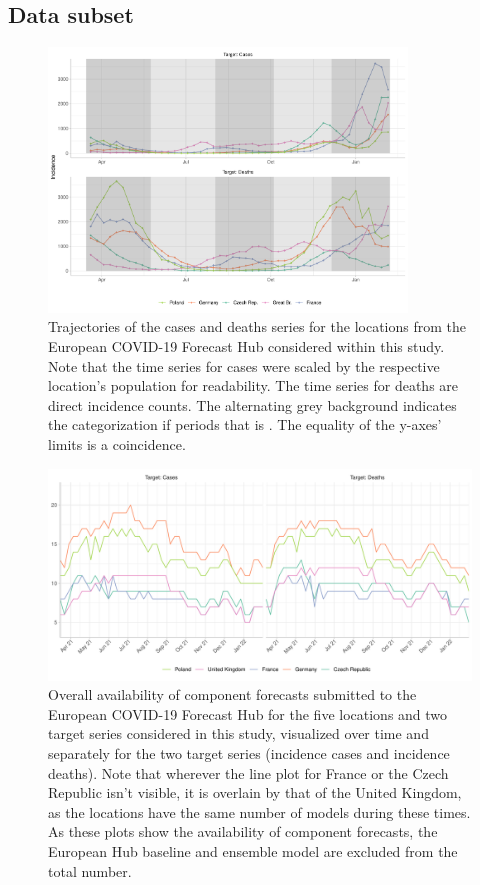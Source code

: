 \subsection{Data subset} \label{sub:hub_data}
\begin{figure}
\centering
\includegraphics[width = 0.85\textwidth]{../plots/trajectories.pdf}
\caption{Trajectories of the cases and deaths series for the locations from the European COVID-19 Forecast Hub considered within this study. Note that the time series for cases were scaled by the respective location's population for readability. The time series for deaths are direct incidence counts. The alternating grey background indicates the categorization if periods that is . The equality of the y-axes' limits is a coincidence.}
\label{fig:trajectories}
\end{figure}
\begin{figure}
\includegraphics[width = \textwidth]{../plots/availability_overall.pdf}
\caption{Overall availability of component forecasts submitted to the European COVID-19 Forecast Hub for the five locations and two target series considered in this study, visualized over time and separately for the two target series (incidence cases and incidence deaths). Note that wherever the line plot for France or the Czech Republic isn't visible, it is overlain by that of the United Kingdom, as the locations have the same number of models during these times. As these plots show the availability of component forecasts, the European Hub baseline and ensemble model are excluded from the total number.}
\label{fig:avail_ovrl}
\end{figure}
